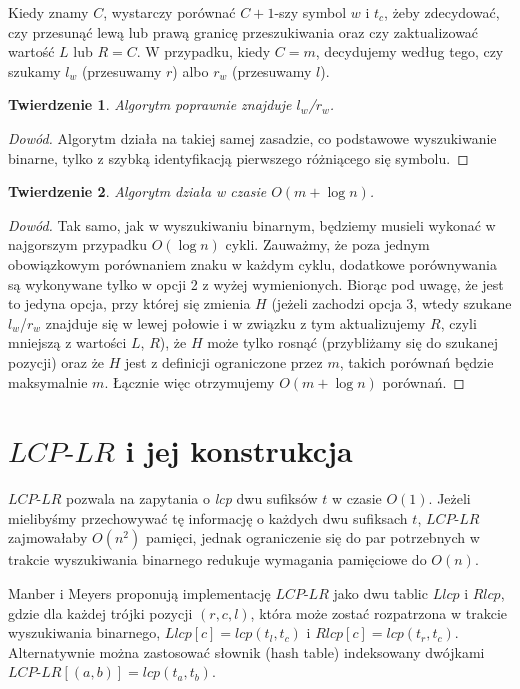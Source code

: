 \documentclass[12pt]{article}
\newtheorem*{theorem}{Twierdzenie}
\begin{document}
Kiedy znamy $C$, wystarczy porównać $C+1$-szy symbol $w$ i $t_c$, żeby zdecydować, czy przesunąć lewą lub prawą granicę przeszukiwania oraz czy zaktualizować wartość $L$ lub $R = C$. W przypadku, kiedy $C = m$, decydujemy według tego, czy szukamy $l_w$ (przesuwamy $r$) albo $r_w$ (przesuwamy $l$).

\begin{theorem}
Algorytm poprawnie znajduje $l_w$/$r_w$.
\end{theorem}

\begin{proof}[Dowód]
Algorytm działa na takiej samej zasadzie, co podstawowe wyszukiwanie binarne, tylko z szybką identyfikacją pierwszego różniącego się symbolu.
\end{proof}

\begin{theorem}
Algorytm działa w czasie $O(m + \log{} n)$.
\end{theorem}

\begin{proof}[Dowód]
Tak samo, jak w wyszukiwaniu binarnym, będziemy musieli wykonać w najgorszym przypadku $O(\log n)$ cykli. Zauważmy, że poza jednym obowiązkowym porównaniem znaku w każdym cyklu, dodatkowe porównywania są wykonywane tylko w opcji 2 z wyżej wymienionych. Biorąc pod uwagę, że jest to jedyna opcja, przy której się zmienia $H$ (jeżeli zachodzi opcja 3, wtedy szukane $l_w$/$r_w$ znajduje się w lewej połowie i w związku z tym aktualizujemy $R$, czyli mniejszą z wartości $L$, $R$), że $H$ może tylko rosnąć (przybliżamy się do szukanej pozycji) oraz że $H$ jest z definicji ograniczone przez $m$, takich porównań będzie maksymalnie $m$. Łącznie więc otrzymujemy $O(m + \log{} n)$ porównań.
\end{proof}

\section*{$LCP\textrm{-}LR$ i jej konstrukcja}

$LCP\textrm{-}LR$ pozwala na zapytania o \textit{lcp} dwu sufiksów $t$ w czasie $O(1)$. Jeżeli mielibyśmy przechowywać tę informację o każdych dwu sufiksach $t$, $LCP\textrm{-}LR$ zajmowałaby $O(n^2)$ pamięci, jednak ograniczenie się do par potrzebnych w trakcie wyszukiwania binarnego redukuje wymagania pamięciowe do $O(n)$.

Manber i Meyers proponują implementację $LCP\textrm{-}LR$ jako dwu tablic $Llcp$ i $Rlcp$, gdzie dla każdej trójki pozycji $(r, c, l)$, która może zostać rozpatrzona w trakcie wyszukiwania binarnego, $Llcp[c] = lcp(t_l, t_c)$ i $Rlcp[c] = lcp(t_r, t_c)$. Alternatywnie można zastosować słownik (hash table) indeksowany dwójkami $LCP\textrm{-}LR[(a, b)] = lcp(t_a, t_b)$.
\end{document}
